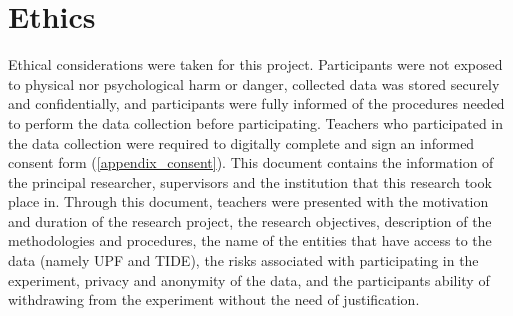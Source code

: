 \section{Ethics}
Ethical considerations were taken for this project. Participants were not exposed to physical nor psychological harm or danger, collected data was stored securely and confidentially, and participants were fully informed of the procedures needed to perform the data collection before participating. Teachers who participated in the data collection were required to digitally complete and sign an informed consent form (\ref{appendix_consent}). This document contains the information of the principal researcher, supervisors and the institution that this research took place in. Through this document, teachers were presented with the motivation and duration of the research project, the research objectives, description of the methodologies and procedures, the name of the entities that have access to the data (namely UPF and TIDE), the risks associated with participating in the experiment, privacy and anonymity of the data, and the participants ability of withdrawing from the experiment without the need of justification.
\newpage


